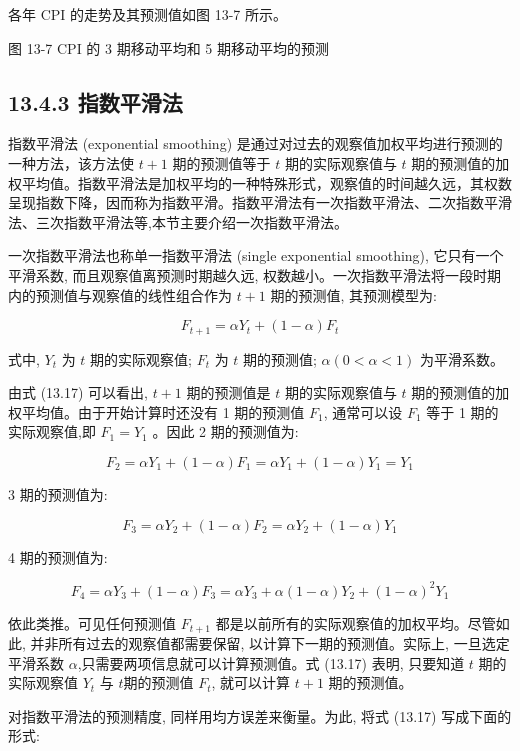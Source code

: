 \documentclass[10pt]{article}
\begin{document}
\begin{CJK*}{UTF8}{bsmi}
各年 CPI 的走势及其预测值如图 13-7 所示。

\begin{center}
\end{center}

图 13-7 CPI 的 3 期移动平均和 5 期移动平均的预测

\subsection*{13.4.3 指数平滑法}
指数平滑法 (exponential smoothing) 是通过对过去的观察值加权平均进行预测的一种方法，该方法使 $t+1$ 期的预测值等于 $t$ 期的实际观察值与 $t$ 期的预测值的加权平均值。指数平滑法是加权平均的一种特殊形式，观察值的时间越久远，其权数呈现指数下降，因而称为指数平滑。指数平滑法有一次指数平滑法、二次指数平滑法、三次指数平滑法等,本节主要介绍一次指数平滑法。

一次指数平滑法也称单一指数平滑法 (single exponential smoothing), 它只有一个平滑系数, 而且观察值离预测时期越久远, 权数越小。一次指数平滑法将一段时期内的预测值与观察值的线性组合作为 $t+1$ 期的预测值, 其预测模型为:


\begin{equation*}
F_{t+1}=\alpha Y_{t}+(1-\alpha) F_{t} \tag{13.17}
\end{equation*}


式中, $Y_{t}$ 为 $t$ 期的实际观察值; $F_{t}$ 为 $t$ 期的预测值; $\alpha(0<\alpha<1)$ 为平滑系数。

由式 (13.17) 可以看出, $t+1$ 期的预测值是 $t$ 期的实际观察值与 $t$ 期的预测值的加权平均值。由于开始计算时还没有 1 期的预测值 $F_{1}$, 通常可以设 $F_{1}$ 等于 1 期的实际观察值,即 $F_{1}=Y_{1}$ 。因此 2 期的预测值为:

$$
F_{2}=\alpha Y_{1}+(1-\alpha) F_{1}=\alpha Y_{1}+(1-\alpha) Y_{1}=Y_{1}
$$

3 期的预测值为:

$$
F_{3}=\alpha Y_{2}+(1-\alpha) F_{2}=\alpha Y_{2}+(1-\alpha) Y_{1}
$$

4 期的预测值为:

$$
F_{4}=\alpha Y_{3}+(1-\alpha) F_{3}=\alpha Y_{3}+\alpha(1-\alpha) Y_{2}+(1-\alpha)^{2} Y_{1}
$$

依此类推。可见任何预测值 $F_{t+1}$ 都是以前所有的实际观察值的加权平均。尽管如此, 并非所有过去的观察值都需要保留, 以计算下一期的预测值。实际上, 一旦选定平滑系数 $\alpha$,只需要两项信息就可以计算预测值。式 (13.17) 表明, 只要知道 $t$ 期的实际观察值 $Y_{t}$ 与 $t$期的预测值 $F_{t}$, 就可以计算 $t+1$ 期的预测值。

对指数平滑法的预测精度, 同样用均方误差来衡量。为此, 将式 (13.17) 写成下面的形式:



\end{CJK*}
\end{document}
